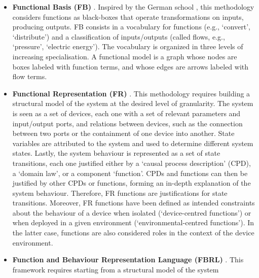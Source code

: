 \documentclass[
]{ceurart}
\begin{document}
\begin{itemize}
    \item \textbf{Functional Basis (FB)} \cite{hirtz_functional_2002}%
    . Inspired by the German school \cite{pahl_engineering_2007}, this methodology considers functions as black-boxes that operate transformations on inputs, producing outputs. FB consists in a vocabulary for functions (e.g., `convert', `distribute') and a classification of inputs/outputs (called flows, e.g., `pressure', `electric energy'). The vocabulary is organized in three levels of increasing specialisation. A functional model is a graph whose nodes are boxes labeled with function terms, and whose edges are arrows labeled with %
    flow terms. %
    \item \textbf{Functional Representation (FR)} \cite{chandrasekaranFunctionalRepresentationDesign1993, chandrasekaranFunctionDeviceRepresentation2000}. This methodology requires building a structural model of the system at the desired level of granularity. The system is seen as a set of devices, each one with a set of relevant parameters and input/output ports, and relations between devices, such as the connection between two ports or the containment of one device into another. State variables are attributed to the system and used to determine different system states. Lastly, the system behaviour is represented as a set of state transitions, each one justified either by a `causal process description' (CPD), a `domain law', or a component `function'. CPDs and functions can then be justified by other CPDs or functions, forming an in-depth explanation of the system behaviour. Therefore, FR functions are justifications for state transitions. Moreover, FR functions have been defined as intended constraints about the behaviour of a device when isolated (`device-centred functions') or when deployed in a given environment (`environmental-centred functions'). In the latter case, functions are also considered roles in the context of the device environment. %
    \item \textbf{Function and Behaviour Representation Language (FBRL)} \cite{sasajimaFBRLFunctionBehavior1995, kitamuraOntologicalModelDevice2006}. This framework requires starting from a structural model of the system

\end{itemize}
\end{document}
